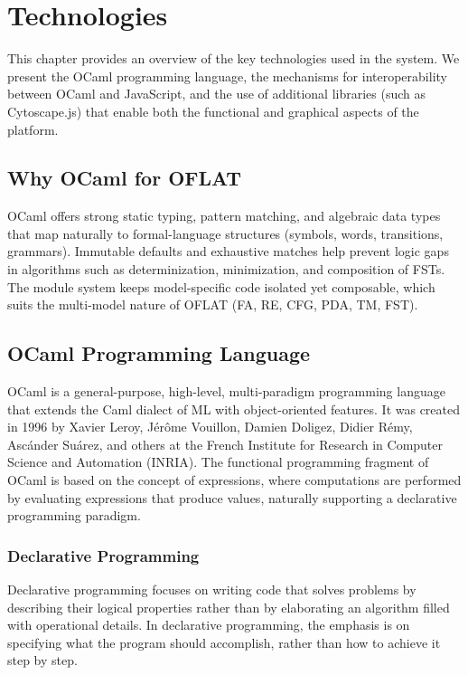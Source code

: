 %

\chapter{Technologies}
\label{cha:technologies}

This chapter provides an overview of the key technologies used in the system. We present
the OCaml programming language, the mechanisms for interoperability between OCaml and JavaScript, 
and the use of additional libraries (such as Cytoscape.js) that enable both the functional and graphical aspects of
the platform.

\section{Why OCaml for OFLAT}
OCaml offers strong static typing, pattern matching, and algebraic data types that map naturally to formal-language structures 
(symbols, words, transitions, grammars). Immutable defaults and exhaustive matches help prevent logic gaps in algorithms 
such as determinization, minimization, and composition of FSTs. The module system keeps model-specific code isolated yet composable, 
which suits the multi-model nature of OFLAT (FA, RE, CFG, PDA, TM, FST).

\section{OCaml Programming Language}

OCaml is a general-purpose, high-level, multi-paradigm programming language that
extends the Caml dialect of ML with object-oriented features. It was created in 1996 by
Xavier Leroy, Jérôme Vouillon, Damien Doligez, Didier Rémy, Ascánder Suárez, and others
at the French Institute for Research in Computer Science and Automation (INRIA). The
functional programming fragment of OCaml is based on the concept of expressions, where
computations are performed by evaluating expressions that produce values, naturally
supporting a declarative programming paradigm. \cite{ocaml_about}

\subsection{Declarative Programming}

Declarative programming focuses on writing code that solves problems by describing their logical properties rather than by elaborating an algorithm filled with operational details. 
In declarative programming\cite{declarative-programming}, the emphasis is on specifying what the program should accomplish, rather than how to achieve it step by step.

